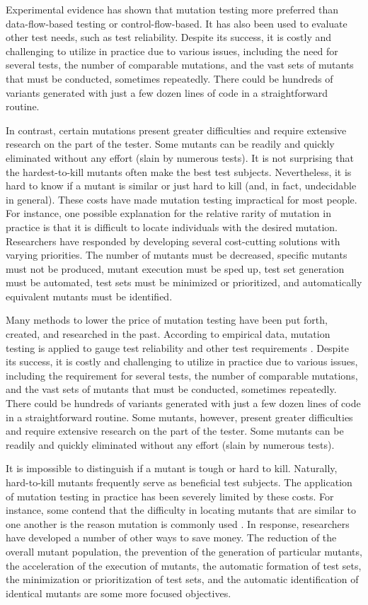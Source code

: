 Experimental evidence has shown that mutation testing more preferred than data-flow-based testing or control-flow-based. It has also been used to evaluate other test needs, such as test reliability. Despite its success, it is costly and challenging to utilize in practice due to various issues, including the need for several tests, the number of comparable mutations, and the vast sets of mutants that must be conducted, sometimes repeatedly. There could be hundreds of variants generated with just a few dozen lines of code in a straightforward routine. \par 
In contrast, certain mutations present greater difficulties and require extensive research on the part of the tester. Some mutants can be readily and quickly eliminated without any effort (slain by numerous tests). It is not surprising that the hardest-to-kill mutants often make the best test subjects. Nevertheless, it is hard to know if a mutant is similar or just hard to kill (and, in fact, undecidable in general). These costs have made mutation testing impractical for most people. For instance, one possible explanation for the relative rarity of mutation in practice is that it is difficult to locate individuals with the desired mutation. Researchers have responded by developing several cost-cutting solutions with varying priorities. The number of mutants must be decreased, specific mutants must not be produced, mutant execution must be sped up, test set generation must be automated, test sets must be minimized or prioritized, and automatically equivalent mutants must be identified.\par 
Many methods to lower the price of mutation testing have been put forth, created, and researched in the past. According to empirical data, mutation testing is applied to gauge test reliability and other test requirements \cite{ref31}. Despite its success, it is costly and challenging to utilize in practice due to various issues, including the requirement for several tests, the number of comparable mutations, and the vast sets of mutants that must be conducted, sometimes repeatedly. There could be hundreds of variants generated with just a few dozen lines of code in a straightforward routine. Some mutants, however, present greater difficulties and require extensive research on the part of the tester. Some mutants can be readily and quickly eliminated without any effort (slain by numerous tests).\par 
It is impossible to distinguish if a mutant is tough or hard to kill. Naturally, hard-to-kill mutants frequently serve as beneficial test subjects. The application of mutation testing in practice has been severely limited by these costs. For instance, some contend that the difficulty in locating mutants that are similar to one another is the reason mutation is commonly used \cite{ref32}. In response, researchers have developed a number of other ways to save money. The reduction of the overall mutant population, the prevention of the generation of particular mutants, the acceleration of the execution of mutants, the automatic formation of test sets, the minimization or prioritization of test sets, and the automatic identification of identical mutants are some more focused objectives.\par 
